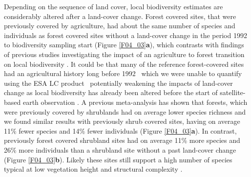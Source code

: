 Depending on the sequence of land cover, local biodiversity estimates are considerably altered after a land-cover change. Forest covered sites, that were previously covered by agriculture, had about the same number of species and individuals as forest covered sites without a land-cover change in the period 1992 to biodiversity sampling start (Figure \ref{F04_03}\textbf{a}), which contrasts with findings of previous studies investigating the impact of an agriculture to forest transition on local biodiversity \citep{Bellemare2002,Hermy2007,Dyer2010}. It could be that many of the reference forest-covered sites had an agricultural history long before 1992 \textendash\ which we were unable to quantify using the ESA LC product \textendash\ potentially weakening the impacts of land-cover change as local biodiversity has already been altered before the start of satellite-based earth observation \citep{Ellis2010,McMichael2017}. A previous meta-analysis has shown that forests, which were previously covered by shrublands had on average lower species richness \citep{Bremer2010} and we found similar results with previously shrub covered sites, having on average 11\% fewer species and 14\% fewer individuals (Figure \ref{F04_03}\textbf{a}). In contrast, previously forest covered shrubland sites had on average 11\% more species and 26\% more individuals than a shrubland site without a past land-cover change (Figure \ref{F04_03}\textbf{b}). Likely these sites still support a high number of species typical at low vegetation height and structural complexity \citep{Chazdon2016}. 

